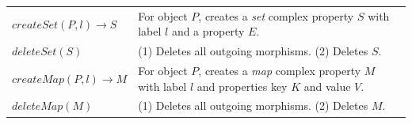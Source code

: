 \begin{table}[htp!]
\begin{tabular}{
    >{\raggedright\arraybackslash}p{35mm}%
    >{\raggedright\arraybackslash}p{84mm}%
    }
    \\
$createSet(P, l) \rightarrow S$  
    &  
    For object $P$, creates a \textit{set} complex property $S$ with label $l$ and a property $E$.    
    \\
$deleteSet(S)$  
    & (1) Deletes all outgoing morphisms. \newline (2) Deletes $S$.
    \\
$createMap(P, l) \rightarrow M$ 
    &  
    For object $P$, creates a \textit{map} complex property $M$ with label $l$ and properties key $K$ and value $V$.
    \\
$deleteMap(M)$  
    & (1) Deletes all outgoing morphisms. \newline (2) Deletes $M$.
    \\

\bottomrule
\end{tabular}
\end{table}



